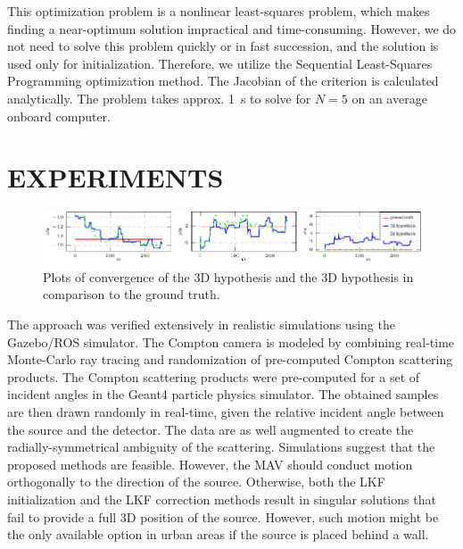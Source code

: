 \documentclass[a4paper,11pt,titlepage,twoside]{book}
\begin{document}
This optimization problem is a nonlinear least-squares problem, which makes finding a near-optimum solution impractical and time-consuming.
However, we do not need to solve this problem quickly or in fast succession, and the solution is used only for initialization.
Therefore, we utilize the Sequential Least-Squares Programming optimization method.
The Jacobian of the criterion is calculated analytically.
The problem takes approx. \SI{1}{\second} to solve for $N = 5$ on an average onboard computer.




\section{EXPERIMENTS}


\begin{figure}[!ht]
  \centering
  \includegraphics[width=1.0\textwidth]{./fig/plots/hypotheses.pdf}
  \caption{Plots of convergence of the 3D hypothesis and the 3D hypothesis in comparison to the ground truth.}
  \label{fig:results}
\end{figure}


The approach was verified extensively in realistic simulations using the Gazebo/ROS simulator.
The Compton camera is modeled by combining real-time Monte-Carlo ray tracing and randomization of pre-computed Compton scattering products.
The Compton scattering products were pre-computed for a set of incident angles in the Geant4 particle physics simulator.
The obtained samples are then drawn randomly in real-time, given the relative incident angle between the source and the detector.
The data are as well augmented to create the radially-symmetrical ambiguity of the scattering.
Simulations suggest that the proposed methods are feasible.
However, the \ac{MAV} should conduct motion orthogonally to the direction of the source.
Otherwise, both the \ac{LKF} initialization and the \ac{LKF} correction methods result in singular solutions that fail to provide a full 3D position of the source.
However, such motion might be the only available option in urban areas if the source is placed behind a wall.
\end{document}
